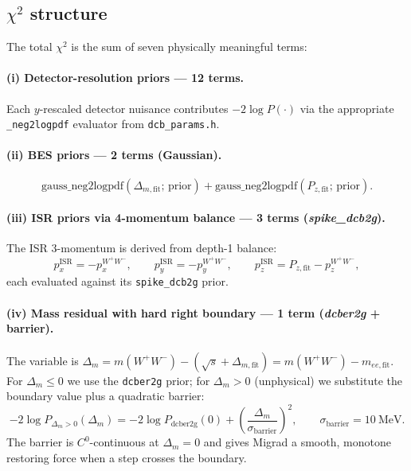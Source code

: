 \documentclass[11pt,a4paper]{article}
\newcommand{\sqs}{\ensuremath{\sqrt{s}}\xspace}
\newcommand{\WW}{\ensuremath{W^+W^-}\xspace}
\newcommand{\codename}[1]{\texttt{\small #1}}
\newcommand{\chisq}{\ensuremath{\chi^2}\xspace}
\begin{document}
\subsection{$\chi^2$ structure}\label{sec:chi2}

The total \chisq is the sum of seven physically meaningful terms:

\paragraph{(i) Detector-resolution priors --- 12 terms.}
Each $y$-rescaled detector nuisance contributes
$-2\log P(\cdot)$ via the appropriate \codename{*\_neg2logpdf}
evaluator from \codename{dcb\_params.h}.

\paragraph{(ii) BES priors --- 2 terms (Gaussian).}
\begin{equation}
\text{gauss\_neg2logpdf}(\Delta_{m,\text{fit}};\,\text{prior}) +
\text{gauss\_neg2logpdf}(P_{z,\text{fit}};\,\text{prior}).
\end{equation}

\paragraph{(iii) ISR priors via 4-momentum balance --- 3 terms
  (\emph{spike\_dcb2g}).}
The ISR 3-momentum is derived from depth-1 balance:
\begin{equation}
  p_x^\text{ISR} = -p_x^{\WW},\qquad
  p_y^\text{ISR} = -p_y^{\WW},\qquad
  p_z^\text{ISR} = P_{z,\text{fit}} - p_z^{\WW},
\end{equation}
each evaluated against its \codename{spike\_dcb2g} prior.

\paragraph{(iv) Mass residual with hard right boundary --- 1 term
  (\emph{dcber2g} + barrier).}
The variable is
$\Delta_m = m(\WW) - (\sqs + \Delta_{m,\text{fit}}) = m(\WW) -
m_{ee,\text{fit}}$. For $\Delta_m\le 0$ we use the \codename{dcber2g}
prior; for $\Delta_m > 0$ (unphysical) we substitute the boundary
value plus a quadratic barrier:
\begin{equation}
  -2\log P_{\Delta_m>0}(\Delta_m) =
  -2\log P_\text{dcber2g}(0) +
  \left(\frac{\Delta_m}{\sigma_\text{barrier}}\right)^2,\qquad
  \sigma_\text{barrier} = 10~\text{MeV}.
\end{equation}
The barrier is $C^0$-continuous at $\Delta_m=0$ and gives Migrad a
smooth, monotone restoring force when a step crosses the boundary.
\end{document}
